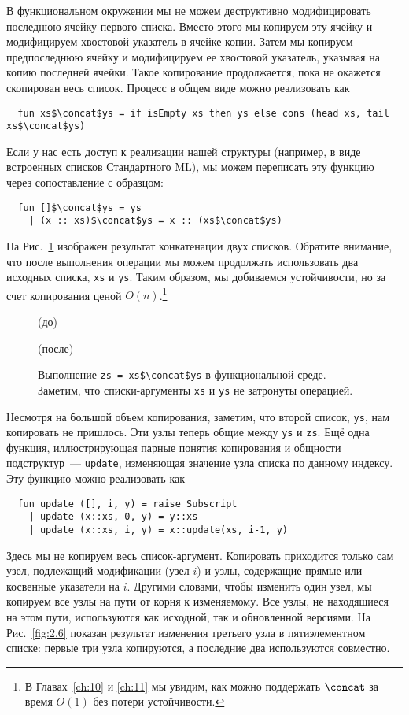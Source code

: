 В функциональном окружении мы не можем деструктивно модифицировать
последнюю ячейку первого списка. Вместо этого мы копируем эту ячейку и
модифицируем хвостовой указатель в ячейке-копии. Затем мы копируем
предпоследнюю ячейку и модифицируем ее хвостовой указатель, указывая
на копию последней ячейки.  Такое копирование продолжается, пока
не окажется скопирован  весь список. Процесс в общем виде можно
реализовать как
\begin{lstlisting}
  fun xs$\concat$ys = if isEmpty xs then ys else cons (head xs, tail xs$\concat$ys)
\end{lstlisting}
Если у нас есть доступ к реализации нашей структуры (например, в виде
встроенных списков Стандартного ML), мы можем переписать эту функцию
через сопоставление с образцом:
\begin{lstlisting}
  fun []$\concat$ys = ys
    | (x :: xs)$\concat$ys = x :: (xs$\concat$ys)
\end{lstlisting}
На Рис.~\ref{fig:2.5} изображен результат конкатенации двух
списков. Обратите внимание, что после выполнения операции мы можем
продолжать использовать два исходных списка, \lstinline!xs! и
\lstinline!ys!. Таким образом, мы добиваемся устойчивости, но за счет
копирования ценой $O(n)$.\footnote{%
  В Главах~\ref{ch:10} и \ref{ch:11} мы увидим, как можно поддержать
  $\concat$ за время $O(1)$ без потери устойчивости.
}

\begin{figure}[h]
  \centering
	\par
  (до)\par
	\vspace{0.5cm}
	\par
  (после)\par
	\vspace{0.5cm}
  \caption{Выполнение \lstinline!zs = xs$\concat$ys! в функциональной среде. Заметим, что списки-аргументы \lstinline!xs! и \lstinline!ys! не затронуты операцией.}
  \label{fig:2.5}
\end{figure}

Несмотря на большой объем копирования, заметим, что второй список, \lstinline!ys!, нам
копировать не пришлось. Эти узлы теперь общие между
\lstinline!ys! и \lstinline!zs!. Ещё одна функция, иллюстрирующая
парные понятия копирования и общности подструктур~---
\lstinline!update!, изменяющая значение узла списка по данному
индексу. Эту функцию можно реализовать как
\begin{lstlisting}
  fun update ([], i, y) = raise Subscript
    | update (x::xs, 0, y) = y::xs
    | update (x::xs, i, y) = x::update(xs, i-1, y)
\end{lstlisting}
Здесь мы не копируем весь список-аргумент. Копировать приходится
только сам узел, подлежащий модификации (узел $i$) и узлы,
содержащие прямые или косвенные указатели на $i$.  Другими словами,
чтобы изменить один узел, мы копируем все узлы на пути от корня
к изменяемому. Все узлы, не находящиеся на этом пути, используются как
исходной, так и обновленной версиями. На Рис.~\ref{fig:2.6} показан
результат изменения третьего узла в пятиэлементном списке: первые
три узла копируются, а последние два используются совместно.


